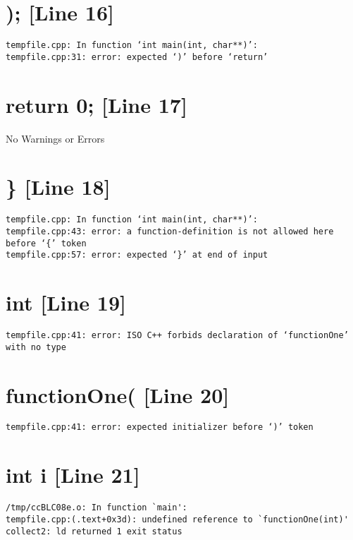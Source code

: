 \documentclass{article}
\begin{document}
\section{); [Line 16]}
\begin{verbatim}
tempfile.cpp: In function ‘int main(int, char**)’:
tempfile.cpp:31: error: expected ‘)’ before ‘return’

\end{verbatim}



\section{return 0; [Line 17]}
No Warnings or Errors



\section{\} [Line 18]}
\begin{verbatim}
tempfile.cpp: In function ‘int main(int, char**)’:
tempfile.cpp:43: error: a function-definition is not allowed here before ‘{’ token
tempfile.cpp:57: error: expected ‘}’ at end of input

\end{verbatim}



\section{int [Line 19]}
\begin{verbatim}
tempfile.cpp:41: error: ISO C++ forbids declaration of ‘functionOne’ with no type

\end{verbatim}



\section{functionOne( [Line 20]}
\begin{verbatim}
tempfile.cpp:41: error: expected initializer before ‘)’ token

\end{verbatim}



\section{int i [Line 21]}
\begin{verbatim}
/tmp/ccBLC08e.o: In function `main':
tempfile.cpp:(.text+0x3d): undefined reference to `functionOne(int)'
collect2: ld returned 1 exit status

\end{verbatim}
\end{document}
